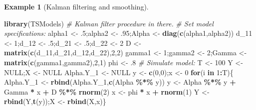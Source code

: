 \documentclass[
  12pt,
]{book}
\newenvironment{Shaded}{\begin{snugshade}}{\end{snugshade}}
\newcommand{\CommentTok}[1]{\textcolor[rgb]{0.56,0.35,0.01}{\textit{#1}}}
\newcommand{\ConstantTok}[1]{\textcolor[rgb]{0.56,0.35,0.01}{#1}}
\newcommand{\ControlFlowTok}[1]{\textcolor[rgb]{0.13,0.29,0.53}{\textbf{#1}}}
\newcommand{\DecValTok}[1]{\textcolor[rgb]{0.00,0.00,0.81}{#1}}
\newcommand{\FunctionTok}[1]{\textcolor[rgb]{0.13,0.29,0.53}{\textbf{#1}}}
\newcommand{\NormalTok}[1]{#1}
\newcommand{\OtherTok}[1]{\textcolor[rgb]{0.56,0.35,0.01}{#1}}
\newcommand{\SpecialCharTok}[1]{\textcolor[rgb]{0.81,0.36,0.00}{\textbf{#1}}}
\theoremstyle{definition}
\theoremstyle{definition}
\newtheorem{example}{Example}[chapter]
\theoremstyle{definition}
\theoremstyle{definition}
\theoremstyle{remark}
\begin{document}
\begin{example}[Kalman filtering and smoothing]
\begin{Shaded}
\begin{Highlighting}[]
\FunctionTok{library}\NormalTok{(TSModels) }\CommentTok{\# Kalman filter procedure in there.}
\CommentTok{\# Set model specifications:}
\NormalTok{alpha1 }\OtherTok{\textless{}{-}}\NormalTok{ .}\DecValTok{5}\NormalTok{;alpha2 }\OtherTok{\textless{}{-}}\NormalTok{ .}\DecValTok{95}\NormalTok{;Alpha }\OtherTok{\textless{}{-}} \FunctionTok{diag}\NormalTok{(}\FunctionTok{c}\NormalTok{(alpha1,alpha2))}
\NormalTok{d\_11 }\OtherTok{\textless{}{-}} \DecValTok{1}\NormalTok{;d\_12 }\OtherTok{\textless{}{-}}\NormalTok{ .}\DecValTok{5}\NormalTok{;d\_21 }\OtherTok{\textless{}{-}}\NormalTok{ .}\DecValTok{5}\NormalTok{;d\_22 }\OtherTok{\textless{}{-}} \DecValTok{2}
\NormalTok{D }\OtherTok{\textless{}{-}} \FunctionTok{matrix}\NormalTok{(}\FunctionTok{c}\NormalTok{(d\_11,d\_21,d\_12,d\_22),}\DecValTok{2}\NormalTok{,}\DecValTok{2}\NormalTok{)}
\NormalTok{gamma1 }\OtherTok{\textless{}{-}} \DecValTok{1}\NormalTok{;gamma2 }\OtherTok{\textless{}{-}} \DecValTok{2}\NormalTok{;Gamma }\OtherTok{\textless{}{-}} \FunctionTok{matrix}\NormalTok{(}\FunctionTok{c}\NormalTok{(gamma1,gamma2),}\DecValTok{2}\NormalTok{,}\DecValTok{1}\NormalTok{)}
\NormalTok{phi }\OtherTok{\textless{}{-}}\NormalTok{ .}\DecValTok{8}
\CommentTok{\# Simulate model:}
\NormalTok{T }\OtherTok{\textless{}{-}} \DecValTok{100}
\NormalTok{Y }\OtherTok{\textless{}{-}} \ConstantTok{NULL}\NormalTok{;X }\OtherTok{\textless{}{-}} \ConstantTok{NULL}
\NormalTok{Alpha.Y\_1 }\OtherTok{\textless{}{-}} \ConstantTok{NULL}
\NormalTok{y }\OtherTok{\textless{}{-}} \FunctionTok{c}\NormalTok{(}\DecValTok{0}\NormalTok{,}\DecValTok{0}\NormalTok{);x }\OtherTok{\textless{}{-}} \DecValTok{0}
\ControlFlowTok{for}\NormalTok{(i }\ControlFlowTok{in} \DecValTok{1}\SpecialCharTok{:}\NormalTok{T)\{}
\NormalTok{  Alpha.Y\_1 }\OtherTok{\textless{}{-}} \FunctionTok{rbind}\NormalTok{(Alpha.Y\_1,}\FunctionTok{c}\NormalTok{(Alpha }\SpecialCharTok{\%*\%}\NormalTok{ y))}
\NormalTok{  y }\OtherTok{\textless{}{-}}\NormalTok{ Alpha }\SpecialCharTok{\%*\%}\NormalTok{ y }\SpecialCharTok{+}\NormalTok{ Gamma }\SpecialCharTok{*}\NormalTok{ x }\SpecialCharTok{+}\NormalTok{ D }\SpecialCharTok{\%*\%} \FunctionTok{rnorm}\NormalTok{(}\DecValTok{2}\NormalTok{)}
\NormalTok{  x }\OtherTok{\textless{}{-}}\NormalTok{ phi }\SpecialCharTok{*}\NormalTok{ x }\SpecialCharTok{+} \FunctionTok{rnorm}\NormalTok{(}\DecValTok{1}\NormalTok{)}
\NormalTok{  Y }\OtherTok{\textless{}{-}} \FunctionTok{rbind}\NormalTok{(Y,}\FunctionTok{t}\NormalTok{(y));X }\OtherTok{\textless{}{-}} \FunctionTok{rbind}\NormalTok{(X,x)\}}

\end{Highlighting}
\end{Shaded}
\end{example}
\end{document}
